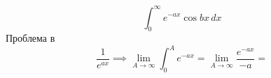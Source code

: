 \documentclass[../rgr1.tex]{subfiles}
\begin{document}
\Solution

\begin{equation}
	\int_0^\infty e^{-ax} \cos bx\, dx
\end{equation}
Проблема в
\begin{equation}
	\frac{1}{e^{ax}} \implies
	\lim_{A\to\infty}\int_0^A e^{-ax}=
	\lim_{A\to\infty}\frac{e^{-ax}}{-a}=
\end{equation}

\end{document}
